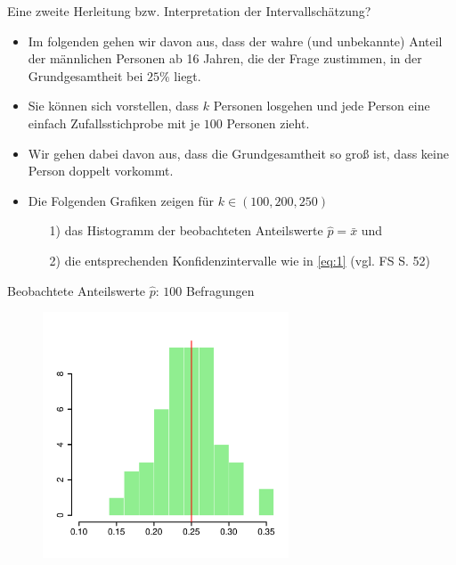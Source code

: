 \documentclass[usenames,dvipsnames,handout]{beamer}
\begin{document}
\begin{frame}{Eine zweite Herleitung bzw. Interpretation der Intervallschätzung?}
\begin{itemize}
\item{Im folgenden gehen wir davon aus, dass der wahre (und unbekannte) Anteil der männlichen Personen ab
16 Jahren, die der Frage zustimmen, in der Grundgesamtheit bei $25\%$ liegt.}\pause
\item{Sie können sich vorstellen, dass $k$ Personen losgehen und jede Person eine einfach Zufallsstichprobe mit je
$100$ Personen zieht.}\pause
\item{Wir gehen dabei davon aus, dass die Grundgesamtheit so groß ist, dass keine Person doppelt vorkommt.}\pause
\item{Die Folgenden Grafiken zeigen für $k \in (100,200,250)$
\begin{itemize}
\item[1)]{das Histogramm der  beobachteten Anteilswerte $\hat{p}=\bar{x}$ und}
\item[2)]{die entsprechenden Konfidenzintervalle wie in \eqref{eq:1} (vgl. FS S. 52)}
\end{itemize}
}
\end{itemize}
\end{frame}



\begin{frame}{Beobachtete Anteilswerte $\hat{p}$: $100$ Befragungen}
  \begin{figure}[ht]
 	\centering
 	      \includegraphics[width=0.65\textwidth]{prob_est.pdf}%
 	\end{figure}
\end{frame}
\end{document}
